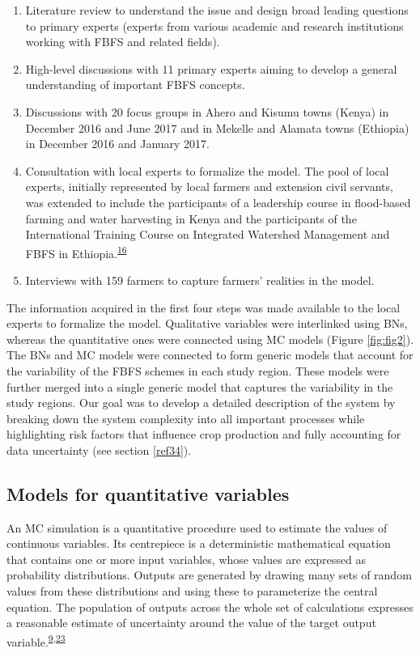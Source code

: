 \documentclass[]{elsarticle} %
\begin{document}
\begin{enumerate}
\def\labelenumi{\arabic{enumi}.}
\item
  Literature review to understand the issue and design broad leading questions to primary experts (experts from various academic and research institutions working with FBFS and related fields).
\item
  High-level discussions with 11 primary experts aiming to develop a general understanding of important FBFS concepts.
\item
  Discussions with 20 focus groups in Ahero and Kisumu towns (Kenya) in December 2016 and June 2017 and in Mekelle and Alamata towns (Ethiopia) in December 2016 and January 2017.
\item
  Consultation with local experts to formalize the model. The pool of local experts, initially represented by local farmers and extension civil servants, was extended to include the participants of a leadership course in flood-based farming and water harvesting in Kenya and the participants of the International Training Course on Integrated Watershed Management and FBFS in Ethiopia.\textsuperscript{\protect\hyperlink{ref-FBLN_2018}{16}}
\item
  Interviews with 159 farmers to capture farmers' realities in the model.
\end{enumerate}

The information acquired in the first four steps was made available to the local experts to formalize the model. Qualitative variables were interlinked using BNs, whereas the quantitative ones were connected using MC models (Figure \ref{fig:fig2}). The BNs and MC models were connected to form generic models that account for the variability of the FBFS schemes in each study region. These models were further merged into a single generic model that captures the variability in the study regions. Our goal was to develop a detailed description of the system by breaking down the system complexity into all important processes while highlighting risk factors that influence crop production and fully accounting for data uncertainty (see section \ref{ref34}).

\hypertarget{ref32}{%
\subsection{Models for quantitative variables}\label{ref32}}

An MC simulation is a quantitative procedure used to estimate the values of continuous variables. Its centrepiece is a deterministic mathematical equation that contains one or more input variables, whose values are expressed as probability distributions. Outputs are generated by drawing many sets of random values from these distributions and using these to parameterize the central equation. The population of outputs across the whole set of calculations expresses a reasonable estimate of uncertainty around the value of the target output variable.\textsuperscript{\protect\hyperlink{ref-Luedeling_et_al_2015}{9},\protect\hyperlink{ref-Rosenstock_et_al_2014}{23}}
\end{document}
